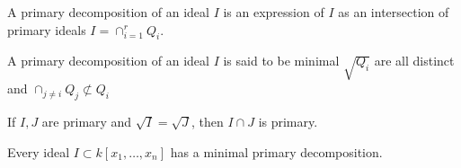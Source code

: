 \documentclass[../main.tex]{subfiles}
\begin{document}
\begin{definition}
A primary decomposition of an ideal $I$ is an expression of $I$ as an intersection of primary ideals $I = \cap_{i=1}^{r} Q_{i}$.
\end{definition}

\begin{definition}
A primary decomposition of an ideal $I$ is said to be minimal $\sqrt{Q_i}$ are all distinct and $\cap_{j\ne i}Q_j \not \subset Q_i$
\end{definition}

\begin{theorem}
If $I,J$ are primary and $\sqrt{I}=\sqrt{J}$, then $I\cap J$ is primary.
\end{theorem}

\begin{theorem}
Every ideal $I \subset k[x_1,\hdots ,x_n]$ has a minimal primary decomposition.
\end{theorem}
\end{document}
